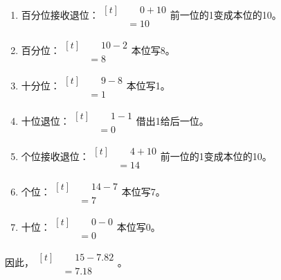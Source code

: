 {\begin{enumerate}[leftmargin=1.7em,itemsep=5pt,topsep=0pt]
\item 百分位接收退位：\(\begin{aligned}[t]&\phantom{={}}0+10\\&=10\end{aligned}\)\quad 前一位的1变成本位的10。
\item 百分位：\(\begin{aligned}[t]&\phantom{={}}10-2\\&=8\end{aligned}\)\quad 本位写8。
\item 十分位：\(\begin{aligned}[t]&\phantom{={}}9-8\\&=1\end{aligned}\)\quad 本位写1。
\item 十位退位：\(\begin{aligned}[t]&\phantom{={}}1-1\\&=0\end{aligned}\)\quad 借出1给后一位。
\item 个位接收退位：\(\begin{aligned}[t]&\phantom{={}}4+10\\&=14\end{aligned}\)\quad 前一位的1变成本位的10。
\item 个位：\(\begin{aligned}[t]&\phantom{={}}14-7\\&=7\end{aligned}\)\quad 本位写7。
\item 十位：\(\begin{aligned}[t]&\phantom{={}}0-0\\&=0\end{aligned}\)\quad 本位写0。
\end{enumerate}
\par\smallskip
因此，\(\begin{aligned}[t]&\phantom{={}}15-7.82\\&=7.18\end{aligned}\)。
\par\medskip

}
